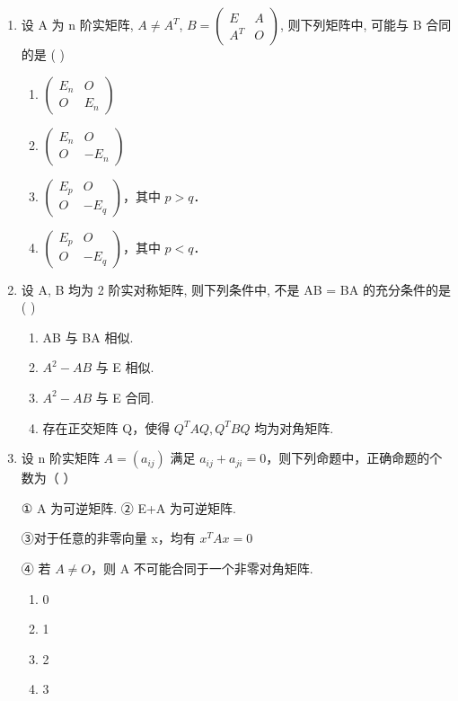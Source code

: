 \documentclass[12pt, a4paper]{ctexart}
\begin{document}
\begin{enumerate}
    \item 设 A 为 n 阶实矩阵, $ A \neq A^{T} $, $ B = \begin{pmatrix} E & A \\ A^{T} & O \end{pmatrix} $, 则下列矩阵中, 可能与 B 合同的是 ( \underline{\hspace{1cm}} )
    \begin{enumerate}[label=(\Alph*)]
        \item $ \begin{pmatrix} E_{n} & O \\ O & E_{n} \end{pmatrix} $
        \item $ \begin{pmatrix} E_{n} & O \\ O & -E_{n} \end{pmatrix} $
        \item $ \begin{pmatrix} E_{p} & O \\ O & -E_{q} \end{pmatrix} $，其中 $ p > q $．
        \item $ \begin{pmatrix} E_{p} & O \\ O & -E_{q} \end{pmatrix} $，其中 $ p < q $．
    \end{enumerate}

    \item 设 A, B 均为 2 阶实对称矩阵, 则下列条件中, 不是 AB = BA 的充分条件的是 ( \underline{\hspace{1cm}} )
    \begin{enumerate}[label=(\Alph*)]
        \item AB 与 BA 相似.
        \item $ A^{2}-AB $ 与 E 相似.
        \item $ A^{2}-AB $ 与 E 合同.
        \item 存在正交矩阵 Q，使得 $ Q^{T}AQ, Q^{T}BQ $ 均为对角矩阵.
    \end{enumerate}

    \item 设 n 阶实矩阵 $ A = \left( a_{ij} \right) $ 满足 $ a_{ij} + a_{ji} = 0 $，则下列命题中，正确命题的个数为（ \underline{\hspace{1cm}} ）
    
    ① A 为可逆矩阵. ② E+A 为可逆矩阵.
    
    ③对于任意的非零向量 x，均有 $ x^{T}Ax=0 $
    
    ④ 若 $ A \neq O $，则 A 不可能合同于一个非零对角矩阵.
    \begin{enumerate}[label=(\Alph*)]
        \item 0
        \item 1
        \item 2
        \item 3
    \end{enumerate}
\end{enumerate}
\end{document}
